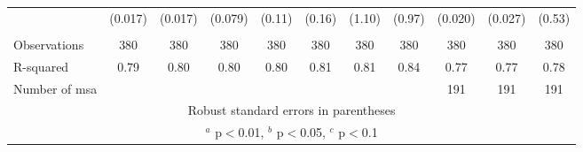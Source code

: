 \documentclass[]{article}
\begin{document}
\begin{tabular}{lcccccccccc}
 & (0.017) & (0.017) & (0.079) & (0.11) & (0.16) & (1.10) & (0.97) & (0.020) & (0.027) & (0.53) \\
 &  &  &  &  &  &  &  &  &  &  \\
Observations & 380 & 380 & 380 & 380 & 380 & 380 & 380 & 380 & 380 & 380 \\
R-squared & 0.79 & 0.80 & 0.80 & 0.80 & 0.81 & 0.81 & 0.84 & 0.77 & 0.77 & 0.78 \\
 Number of msa &  &  &  &  &  &  &  & 191 & 191 & 191 \\ \hline
\multicolumn{11}{c}{ Robust standard errors in parentheses} \\
\multicolumn{11}{c}{ $^a$ p$<$0.01, $^b$ p$<$0.05, $^c$ p$<$0.1} \\
\end{tabular}
\end{document}

